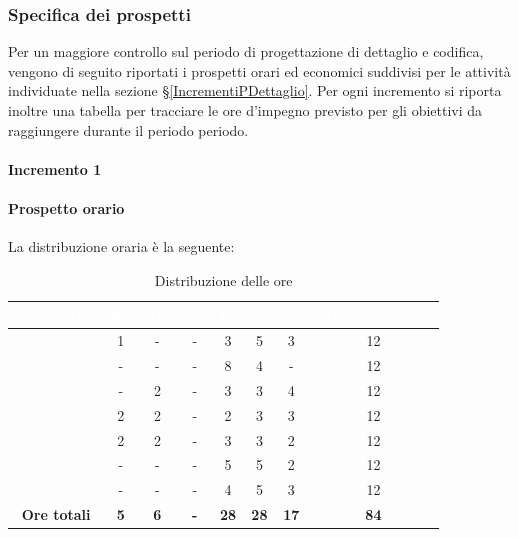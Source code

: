 \subsubsection{Specifica dei prospetti}\label{SpecificaPDettaglio}
Per un maggiore controllo sul periodo di progettazione di dettaglio e codifica, vengono di seguito riportati i prospetti orari ed economici suddivisi per le attività individuate nella sezione \S\ref{IncrementiPDettaglio}. Per ogni incremento si riporta inoltre una tabella per tracciare le ore d'impegno previsto per gli obiettivi da raggiungere durante il periodo periodo.
\paragraph{Incremento 1}
\paragraph*{Prospetto orario}
La distribuzione oraria è la seguente:
\begin{table}[H]
	\begin{center}
		\begin{tabular}{ |c c c c c c c c| }
			\rowcolor{darkblue} 
			\textcolor{white}{\textbf{Nominativo}} & \textcolor{white}{\textbf{Re}} & \textcolor{white}{\textbf{Am}} & \textcolor{white}{\textbf{An}} & \textcolor{white}{\textbf{Pt}} & \textcolor{white}{\textbf{Pr}} & \textcolor{white}{\textbf{Ve}} & \textcolor{white}{\textbf{Ore Complessive}} \\ \hline
		\BL 	& 1  	& -  	& - 	& 3 	& 5 	& 3 	& 12 \\ \hline
		\FF 	& -  	& -  	& - 	& 8 	& 4 	& -  	& 12 \\ \hline
		\MM 	& -  	& 2  	& - 	& 3 	& 3 	& 4 	& 12 \\ \hline
		\PC 	& 2 	& 2  	& - 	& 2 	& 3 	& 3 	& 12 \\ \hline
		\TG 	& 2  	& 2		& - 	& 3 	& 3 	& 2 	& 12 \\ \hline
		\TL 	& -  	& - 	& - 	& 5 	& 5 	& 2 	& 12 \\ \hline
		\VD 	& -  	& -  	& - 	& 4 	& 5 	& 3 	& 12 \\ \hline
		\textbf{Ore totali} & \textbf{5} & \textbf{6} & \textbf{-} & \textbf{28} & \textbf{28} & \textbf{17} & \textbf{84} \\ \hline
		\end{tabular}
		\caption{Distribuzione delle ore}
	\end{center}
\end{table}
